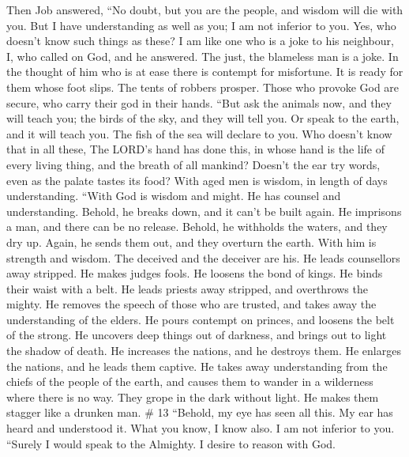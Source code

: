  Then Job answered,  ``No doubt, but you are the
people, and wisdom will die with you.  But I have
understanding as well as you; I am not inferior to you. Yes, who doesn't
know such things as these?  I am like one who is a joke to
his neighbour, I, who called on God, and he answered. The just, the
blameless man is a joke.  In the thought of him who is at
ease there is contempt for misfortune. It is ready for them whose foot
slips.  The tents of robbers prosper. Those who provoke God
are secure, who carry their god in their hands.  ``But ask
the animals now, and they will teach you; the birds of the sky, and they
will tell you.  Or speak to the earth, and it will teach
you. The fish of the sea will declare to you.  Who doesn't
know that in all these, The LORD's hand has done this,  in
whose hand is the life of every living thing, and the breath of all
mankind?  Doesn't the ear try words, even as the palate
tastes its food?  With aged men is wisdom, in length of
days understanding.  ``With God is wisdom and might. He has
counsel and understanding.  Behold, he breaks down, and it
can't be built again. He imprisons a man, and there can be no release.
 Behold, he withholds the waters, and they dry up. Again,
he sends them out, and they overturn the earth.  With him
is strength and wisdom. The deceived and the deceiver are his.
 He leads counsellors away stripped. He makes judges fools.
 He loosens the bond of kings. He binds their waist with a
belt.  He leads priests away stripped, and overthrows the
mighty.  He removes the speech of those who are trusted,
and takes away the understanding of the elders.  He pours
contempt on princes, and loosens the belt of the strong. 
He uncovers deep things out of darkness, and brings out to light the
shadow of death.  He increases the nations, and he destroys
them. He enlarges the nations, and he leads them captive. 
He takes away understanding from the chiefs of the people of the earth,
and causes them to wander in a wilderness where there is no way.
 They grope in the dark without light. He makes them
stagger like a drunken man. \# 13  ``Behold, my eye has seen
all this. My ear has heard and understood it.  What you
know, I know also. I am not inferior to you.  ``Surely I
would speak to the Almighty. I desire to reason with God. 
